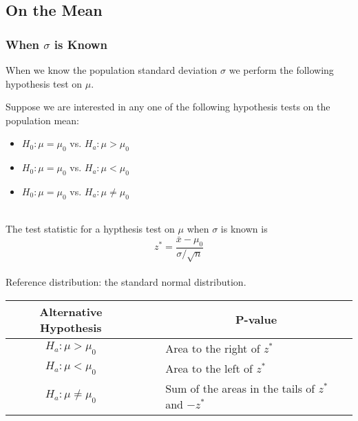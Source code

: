 \subsection{On the Mean}

\subsubsection{When $\sigma$ is Known}

When we know the population standard deviation $\sigma$
we perform the following hypothesis test on $\mu$.

\begin{hyp}
Suppose we are interested in any one of the following hypothesis tests
on the population mean:\\

\begin{itemize}
\item	$H_{0} : \mu = \mu_{0}$  vs. $H_{a}  : \mu > \mu_{0}$
\item	$H_{0} : \mu = \mu_{0}$  vs. $H_{a}  : \mu < \mu_{0}$
\item	$H_{0} : \mu = \mu_{0}$  vs. $H_{a}  : \mu \neq \mu_{0}$
\end{itemize}

\hfill\\
The test statistic for a hypthesis test on $\mu$ when $\sigma$ is known is
\begin{equation}\label{eqnCISigmaKnown}
z^{*}	= \frac{ \bar{x} - \mu_{0} }{ \sigma / \sqrt{n} }
\end{equation}
\hfill\\
Reference distribution: the standard normal distribution.\\

\begin{center}
\begin{tabular}{ccl}
Alternative Hypothesis	&	~\quad~	&	\multicolumn{1}{c}{P-value}	\\
\hline
$H_{a}  : \mu > \mu_{0}$		&	&	Area to the right of $z^{*}$	\\
$H_{a}  : \mu < \mu_{0}$		&	&	Area to the left of $z^{*}$	\\
$H_{a}  : \mu \neq \mu_{0}$	&	&	Sum of the areas in the tails of $z^{*}$ and $-z^{*}$
\end{tabular}
\end{center}

\end{hyp}





